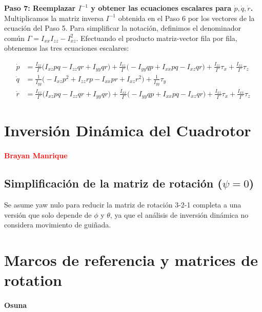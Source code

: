 \documentclass[11pt,a4paper]{article}
\begin{document}
\vspace{0.3cm}
\textbf{Paso 7: Reemplazar $I^{-1}$ y obtener las ecuaciones escalares para $\dot{p}, \dot{q}, \dot{r}$.} \\
Multiplicamos la matriz inversa $I^{-1}$ obtenida en el Paso 6 por los vectores de la ecuación del Paso 5. Para simplificar la notación, definimos el denominador común $\Gamma = I_{xx}I_{zz} - I_{xz}^2$. Efectuando el producto matriz-vector fila por fila, obtenemos las tres ecuaciones escalares:

\begin{align*}
    \dot{p} &= \frac{I_{zz}}{\Gamma} \big( I_{xz}pq - I_{zz}qr + I_{yy}qr \big) + \frac{I_{xz}}{\Gamma} \big( -I_{yy}qp + I_{xx}pq - I_{xz}qr \big) + \frac{I_{zz}}{\Gamma}\tau_x + \frac{I_{xz}}{\Gamma}\tau_z \\[10pt]
    \dot{q} &= \frac{1}{I_{yy}} \big( -I_{xz}p^2 + I_{zz}rp - I_{xx}pr + I_{xz}r^2 \big) + \frac{1}{I_{yy}}\tau_y \\[10pt]
    \dot{r} &= \frac{I_{xz}}{\Gamma} \big( I_{xz}pq - I_{zz}qr + I_{yy}qr \big) + \frac{I_{xx}}{\Gamma} \big( -I_{yy}qp + I_{xx}pq - I_{xz}qr \big) + \frac{I_{xz}}{\Gamma}\tau_x + \frac{I_{xx}}{\Gamma}\tau_z
\end{align*}





\section*{Inversión Dinámica del Cuadrotor}
\paragraph{\textcolor{red} {Brayan Manrique}}
\subsection*{Simplificación de la matriz de rotación ($\psi=0$)}

Se asume yaw nulo para reducir la matriz de rotación 3-2-1 completa a una versión que solo depende de $\phi$ y $\theta$, ya que el análisis de inversión dinámica no considera movimiento de guiñada.

\section{Marcos de referencia y matrices de rotation}
\paragraph{Osuna}
\end{document}
